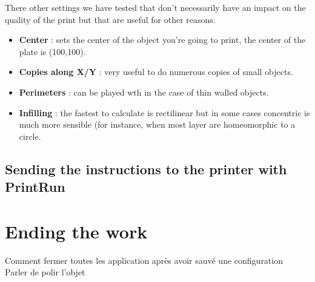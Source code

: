 \documentclass{article}
\begin{document}
There other settings we have tested that don't necessarily have an impact on the quality of the print but that are useful for other reasons.
\begin{itemize}
\item \textbf{Center} : sets the center of the object you're going to print, the center of the plate is (100,100).
\item \textbf{Copies along X/Y} : very useful to do numerous copies of small objects.
\item \textbf{Perimeters} : can be played wth in the case of thin walled objects.
\item \textbf{Infilling} : the fastest to calculate is rectilinear but in some cases concentric is much more sensible (for instance, when most layer are homeomorphic to a circle.
\end{itemize}
\subsection{Sending the instructions to the printer with PrintRun}

\newpage

\section{Ending the work}

Comment fermer toutes les application après avoir sauvé une configuration \\
Parler de polir l'objet \\
\end{document}
